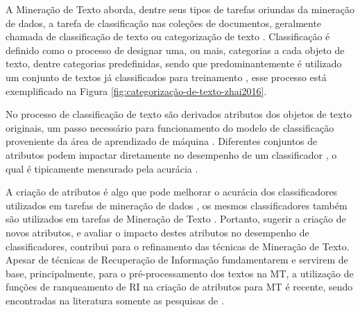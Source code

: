    
    
    A Mineração de Texto aborda, dentre seus tipos de tarefas oriundas da mineração de dados, a tarefa de classificação nas coleções de documentos, geralmente chamada de classificação de texto ou categorização de texto \cite[p.~35]{Zhai2016TDMA}.
    Classificação é definido como o processo de designar uma, ou mais, categorias a cada objeto de texto, dentre categorias predefinidas, sendo que predominantemente é utilizado um conjunto de textos já classificados para treinamento \cite[p.~7]{Jo2018TMCIBDC} \cite[p.~299]{Zhai2016TDMA}, esse processo está exemplificado na Figura \ref{fig:categorização-de-texto-zhai2016}.
    
    No processo de classificação de texto são derivados atributos dos objetos de texto originais, um passo necessário para funcionamento do modelo de classificação proveniente da área de aprendizado de máquina \cite[p.~64]{Feldman:2006:TMH:1076381}.
    Diferentes conjuntos de atributos podem impactar diretamente no desempenho de um classificador \cite[p.~304--306]{Zhai2016TDMA}, o qual é tipicamente mensurado pela acurácia\footnotemark{} \cite[p.~313--314]{Zhai2016TDMA} \cite[p.~9]{Jo2018TMCIBDC}.
    
    
    A criação de atributos\footnotemark{} é algo que pode melhorar o acurácia dos classificadores utilizados em tarefas de mineração de dados \cite[p.~118]{MaFEDS2018}, os mesmos classificadores também são utilizados em tarefas de Mineração de Texto \cite[p.~1241]{Sammut2017EMLDM}. 
    Portanto, sugerir a criação de novos atributos, e avaliar o impacto destes atributos no desempenho de classificadores, contribui para o refinamento das técnicas de Mineração de Texto.
    Apesar de técnicas de Recuperação de Informação fundamentarem e servirem de base, principalmente, para o pré-processamento dos textos na MT, a utilização de funções de ranqueamento de RI na criação de atributos para MT é recente, sendo encontradas na literatura somente as pesquisas de .
    

